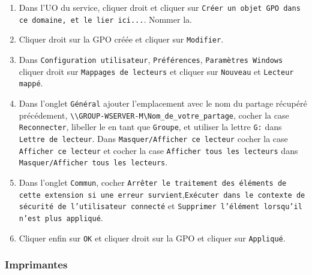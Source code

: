 \begin{enumerate}
						\item Dans l'UO du service, cliquer droit et cliquer sur \texttt{Créer un objet GPO dans ce domaine, et le lier ici...}. Nommer la. 
						\item Cliquer droit sur la GPO créée et cliquer sur \texttt{Modifier}.
						\item Dans \texttt{Configuration utilisateur}, \texttt{Préférences}, \texttt{Paramètres Windows} cliquer droit sur \texttt{Mappages de lecteurs} et cliquer sur \texttt{Nouveau} et \texttt{Lecteur mappé}.
						\item Dans l'onglet \texttt{Général} ajouter l'emplacement avec le nom du partage récupéré précédement, \texttt{\textbackslash{}\textbackslash{}GROUP-WSERVER-M\textbackslash{}Nom\_de\_votre\_partage}, cocher la case \texttt{Reconnecter}, libeller le en tant que \texttt{Groupe}, et utiliser la lettre \texttt{G:} dans \texttt{Lettre de lecteur}. Dans \texttt{Masquer/Afficher ce lecteur} cocher la case \texttt{Afficher ce lecteur} et cocher la case \texttt{Afficher tous les lecteurs} dans \texttt{Masquer/Afficher tous les lecteurs}.
						\item Dans l'onglet \texttt{Commun}, cocher \texttt{Arrêter le traitement des éléments de cette extension si une erreur survient},\texttt{Exécuter dans le contexte de sécurité de l'utilisateur connecté} et \texttt{Supprimer l'élément lorsqu'il n'est plus appliqué}.
						\item Cliquer enfin sur \texttt{OK} et cliquer droit sur la GPO et cliquer sur \texttt{Appliqué}.
				\end{enumerate}
		\subsubsection{Imprimantes}
